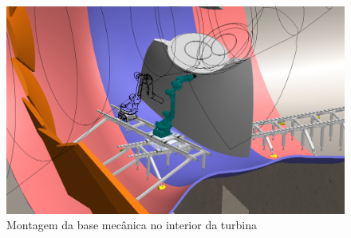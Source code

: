 \begin{figure}[H]
	\centering
	\includegraphics[width=0.9\columnwidth]{figs/construcao/EMMA_Base_Secundaria_01}
	\caption{Montagem da base mecânica no interior da turbina}
    \label{fig::EMMA_Base_Secundaria_01}
\end{figure}

